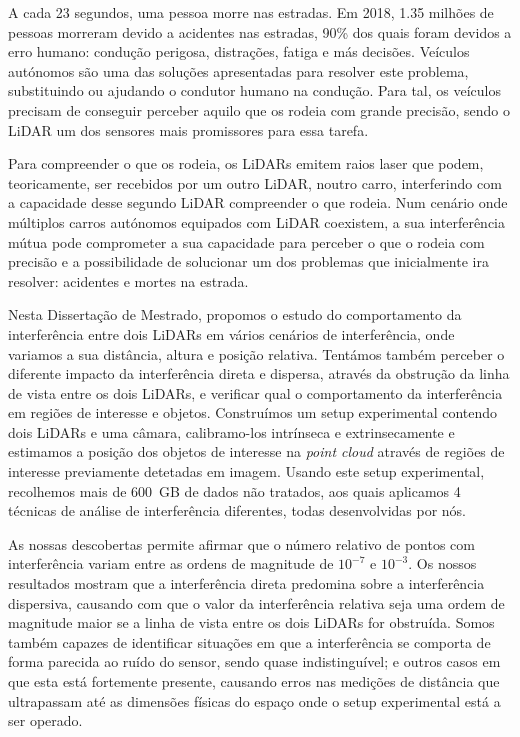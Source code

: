 A cada 23 segundos, uma pessoa morre nas estradas. Em 2018, 1.35 milhões de pessoas morreram devido a acidentes nas estradas, 90\% dos quais foram devidos a erro humano: condução perigosa, distrações, fatiga e más decisões. Veículos autónomos são uma das soluções apresentadas para resolver este problema, substituindo ou ajudando o condutor humano na condução. Para tal, os veículos precisam de conseguir perceber aquilo que os rodeia com grande precisão, sendo o LiDAR um dos sensores mais promissores para essa tarefa.

Para compreender o que os rodeia, os LiDARs emitem raios laser que podem, teoricamente, ser recebidos por um outro LiDAR, noutro carro, interferindo com a capacidade desse segundo LiDAR compreender o que rodeia. Num cenário onde múltiplos carros autónomos equipados com LiDAR coexistem, a sua interferência mútua pode comprometer a sua capacidade para perceber o que o rodeia com precisão e a possibilidade de solucionar um dos problemas que inicialmente ira resolver: acidentes e mortes na estrada.

Nesta Dissertação de Mestrado, propomos o estudo do comportamento da interferência entre dois LiDARs em vários cenários de interferência, onde variamos a sua distância, altura e posição relativa. Tentámos também perceber o diferente impacto da interferência direta e dispersa, através da obstrução da linha de vista entre os dois LiDARs, e verificar qual o comportamento da interferência em regiões de interesse e objetos. Construímos um setup experimental contendo dois LiDARs e uma câmara, calibramo-los intrínseca e extrinsecamente e estimamos a posição dos objetos de interesse na \textit{point cloud} através de regiões de interesse previamente detetadas em imagem. Usando este setup experimental, recolhemos mais de $600$~GB de dados não tratados, aos quais aplicamos 4 técnicas de análise de interferência diferentes, todas desenvolvidas por nós.

As nossas descobertas permite afirmar que o número relativo de pontos com interferência variam entre as ordens de magnitude de $10^{-7}$ e $10^{-3}$. Os nossos resultados mostram que a interferência direta predomina sobre a interferência dispersiva, causando com que o valor da interferência relativa seja uma ordem de magnitude maior se a linha de vista entre os dois LiDARs for obstruída. Somos também capazes de identificar situações em que a interferência se comporta de forma parecida ao ruído do sensor, sendo quase indistinguível; e outros casos em que esta está fortemente presente, causando erros nas medições de distância que ultrapassam até as dimensões físicas do espaço onde o setup experimental está a ser operado.

